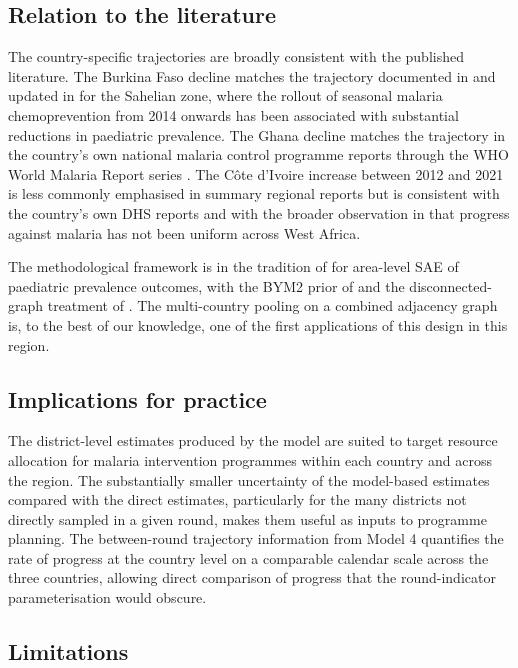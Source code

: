 \documentclass{article}
\begin{document}
\subsection{Relation to the
literature}\label{relation-to-the-literature}

The country-specific trajectories are broadly consistent with the
published literature. The Burkina Faso decline matches the trajectory
documented in \citep{bhatt2015} and updated in \citep{weiss2020} for the
Sahelian zone, where the rollout of seasonal malaria chemoprevention
from 2014 onwards has been associated with substantial reductions in
paediatric prevalence. The Ghana decline matches the trajectory in the
country's own national malaria control programme reports through the WHO
World Malaria Report series \citep{who2023}. The Côte d'Ivoire increase
between 2012 and 2021 is less commonly emphasised in summary regional
reports but is consistent with the country's own DHS reports and with
the broader observation in \citep{weiss2020} that progress against
malaria has not been uniform across West Africa.

The methodological framework is in the tradition of
\citep{mercer2015, wakefield2020} for area-level SAE of paediatric
prevalence outcomes, with the BYM2 prior of \citep{riebler2016} and the
disconnected-graph treatment of \citep{freni2018}. The multi-country
pooling on a combined adjacency graph is, to the best of our knowledge,
one of the first applications of this design in this region.

\subsection{Implications for practice}\label{implications-for-practice}

The district-level estimates produced by the model are suited to target
resource allocation for malaria intervention programmes within each
country and across the region. The substantially smaller uncertainty of
the model-based estimates compared with the direct estimates,
particularly for the many districts not directly sampled in a given
round, makes them useful as inputs to programme planning. The
between-round trajectory information from Model 4 quantifies the rate of
progress at the country level on a comparable calendar scale across the
three countries, allowing direct comparison of progress that the
round-indicator parameterisation would obscure.

\subsection{Limitations}\label{limitations}
\end{document}
